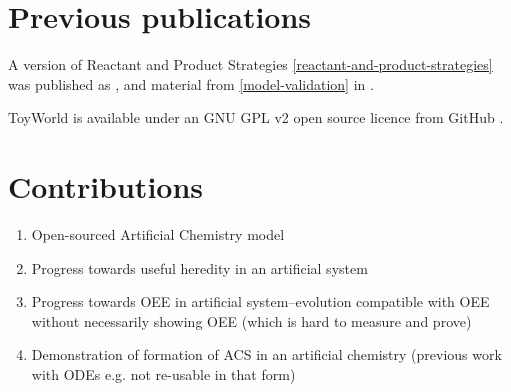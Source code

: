 \section{Previous publications}\label{previous-publications}

A version of Reactant and Product Strategies \cref{reactant-and-product-strategies} was published as \cite{Young2015},
and material from \cref{model-validation} in \cite{Young2013}.

ToyWorld is available under an GNU GPL v2 open source licence from GitHub \cite{toyworld}.

\section{Contributions}\label{contributions}

\begin{enumerate}
	\item
	Open-sourced Artificial Chemistry model
	\item
	Progress towards useful heredity in an artificial system
	\item
	Progress towards OEE in artificial system--evolution compatible with
	OEE without necessarily showing OEE (which is hard to measure and
	prove)
	\item
	Demonstration of formation of ACS in an artificial chemistry (previous
	work with ODEs e.g. \autocite{Hurndall2014} not re-usable in that form)
\end{enumerate}
